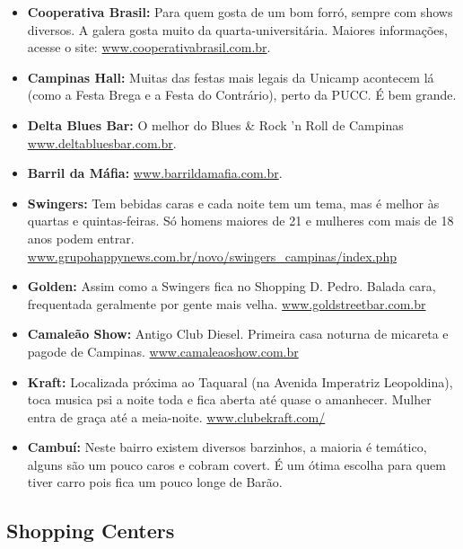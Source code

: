 \begin{itemize}
\item   \textbf{Cooperativa Brasil:} Para quem gosta de um bom forró, sempre com
    shows diversos. A galera gosta muito da quarta-universitária. Maiores
    informações, acesse o site: \url{www.cooperativabrasil.com.br}.

\item   \textbf{Campinas Hall:} Muitas das festas mais legais da Unicamp
    acontecem lá (como a Festa Brega e a Festa do Contrário), perto da PUCC.
    É bem grande.

\item   \textbf{Delta Blues Bar:} O melhor do Blues \& Rock 'n Roll de Campinas
    \url{www.deltabluesbar.com.br}.

\item   \textbf{Barril da Máfia:} \url{www.barrildamafia.com.br}.

\item   \textbf{Swingers:} Tem bebidas caras e cada noite tem um tema, mas
    é melhor às quartas e quintas-feiras. Só homens maiores de 21 e mulheres com
    mais de 18 anos podem entrar.
    \url{www.grupohappynews.com.br/novo/swingers_campinas/index.php}

\item   \textbf{Golden:} Assim como a Swingers fica no Shopping D. Pedro. Balada
    cara, frequentada geralmente por gente mais velha.
    \url{www.goldstreetbar.com.br}

\item   \textbf{Camaleão Show:} Antigo Club Diesel. Primeira casa noturna de
    micareta e pagode de Campinas. \url{www.camaleaoshow.com.br}

\item   \textbf{Kraft:} Localizada próxima ao Taquaral (na Avenida Imperatriz
    Leopoldina), toca musica psi a noite toda e fica aberta até quase
    o amanhecer. Mulher entra de graça até a meia-noite.
    \url{www.clubekraft.com/}

\item   \textbf{Cambuí:} Neste bairro existem diversos barzinhos, a maioria
    é temático, alguns são um pouco caros e cobram covert. É um ótima escolha
    para quem tiver carro pois fica um pouco longe de Barão.

\end{itemize}

\subsection{Shopping Centers}


